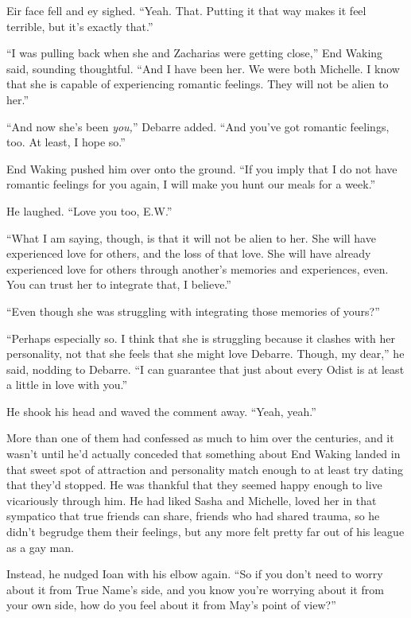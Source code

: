 Eir face fell and ey sighed. ``Yeah. That. Putting it that way makes it feel terrible, but it's exactly that.''

``I was pulling back when she and Zacharias were getting close,'' End Waking said, sounding thoughtful. ``And I have been her. We were both Michelle. I know that she is capable of experiencing romantic feelings. They will not be alien to her.''

``And now she's been \emph{you,}'' Debarre added. ``And you've got romantic feelings, too. At least, I hope so.''

End Waking pushed him over onto the ground. ``If you imply that I do not have romantic feelings for you again, I will make you hunt our meals for a week.''

He laughed. ``Love you too, E.W.''

``What I am saying, though, is that it will not be alien to her. She will have experienced love for others, and the loss of that love. She will have already experienced love for others through another's memories and experiences, even. You can trust her to integrate that, I believe.''

``Even though she was struggling with integrating those memories of yours?''

``Perhaps especially so. I think that she is struggling because it clashes with her personality, not that she feels that she might love Debarre. Though, my dear,'' he said, nodding to Debarre. ``I can guarantee that just about every Odist is at least a little in love with you.''

He shook his head and waved the comment away. ``Yeah, yeah.''

More than one of them had confessed as much to him over the centuries, and it wasn't until he'd actually conceded that something about End Waking landed in that sweet spot of attraction and personality match enough to at least try dating that they'd stopped. He was thankful that they seemed happy enough to live vicariously through him. He had liked Sasha and Michelle, loved her in that sympatico that true friends can share, friends who had shared trauma, so he didn't begrudge them their feelings, but any more felt pretty far out of his league as a gay man.

Instead, he nudged Ioan with his elbow again. ``So if you don't need to worry about it from True Name's side, and you know you're worrying about it from your own side, how do you feel about it from May's point of view?''

